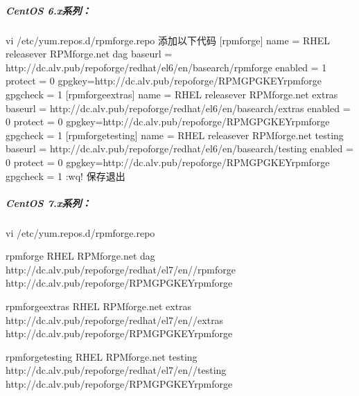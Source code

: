 \documentclass[letterpaper,10pt,english]{sphinxmanual}
\begin{document}
\subparagraph{CentOS 6.x系列：}
\label{\detokenize{software_manage/yum/yum_official_sync:id12}}
%
\begin{sphinxVerbatim}[commandchars=\\\{\}]
vi /etc/yum.repos.d/rpmforge.repo \PYGZsh{}添加以下代码
[rpmforge]
name = RHEL \PYGZdl{}releasever \PYGZhy{} RPMforge.net \PYGZhy{} dag
baseurl = http://dc.alv.pub/repoforge/redhat/el6/en/\PYGZdl{}basearch/rpmforge
enabled = 1
protect = 0
gpgkey=http://dc.alv.pub/repoforge/RPM\PYGZhy{}GPG\PYGZhy{}KEY\PYGZhy{}rpmforge
gpgcheck = 1
[rpmforge\PYGZhy{}extras]
name = RHEL \PYGZdl{}releasever \PYGZhy{} RPMforge.net \PYGZhy{} extras
baseurl = http://dc.alv.pub/repoforge/redhat/el6/en/\PYGZdl{}basearch/extras
enabled = 0
protect = 0
gpgkey=http://dc.alv.pub/repoforge/RPM\PYGZhy{}GPG\PYGZhy{}KEY\PYGZhy{}rpmforge
gpgcheck = 1
[rpmforge\PYGZhy{}testing]
name = RHEL \PYGZdl{}releasever \PYGZhy{} RPMforge.net \PYGZhy{} testing
baseurl = http://dc.alv.pub/repoforge/redhat/el6/en/\PYGZdl{}basearch/testing
enabled = 0
protect = 0
gpgkey=http://dc.alv.pub/repoforge/RPM\PYGZhy{}GPG\PYGZhy{}KEY\PYGZhy{}rpmforge
gpgcheck = 1
:wq! \PYGZsh{}保存退出
\end{sphinxVerbatim}


\subparagraph{CentOS 7.x系列：}
\label{\detokenize{software_manage/yum/yum_official_sync:id13}}
%
\begin{sphinxVerbatim}[commandchars=\\\{\}]
vi /etc/yum.repos.d/rpmforge.repo 

\PYG{o}{[}rpmforge\PYG{o}{]}
  RHEL  \PYGZhy{} RPMforge.net \PYGZhy{} dag
  http://dc.alv.pub/repoforge/redhat/el7/en//rpmforge
  
  
http://dc.alv.pub/repoforge/RPM\PYGZhy{}GPG\PYGZhy{}KEY\PYGZhy{}rpmforge
  

\PYG{o}{[}rpmforge\PYGZhy{}extras\PYG{o}{]}
  RHEL  \PYGZhy{} RPMforge.net \PYGZhy{} extras
  http://dc.alv.pub/repoforge/redhat/el7/en//extras
  
  
http://dc.alv.pub/repoforge/RPM\PYGZhy{}GPG\PYGZhy{}KEY\PYGZhy{}rpmforge
  

\PYG{o}{[}rpmforge\PYGZhy{}testing\PYG{o}{]}
  RHEL  \PYGZhy{} RPMforge.net \PYGZhy{} testing
  http://dc.alv.pub/repoforge/redhat/el7/en//testing
  
  
http://dc.alv.pub/repoforge/RPM\PYGZhy{}GPG\PYGZhy{}KEY\PYGZhy{}rpmforge
  
\end{sphinxVerbatim}
\end{document}
